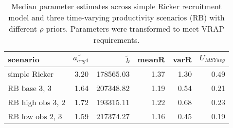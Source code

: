 \begin{table}[ht]
\centering
\caption{Median parameter estimates across simple Ricker recruitment model and 
 three time-varying productivity scenarios (RB) with different $\rho$ priors. Parameters were transformed to meet VRAP requirements.} 
\label{vraptab}
\begin{tabular}{lrrrrr}
  \hline
scenario & $\widetilde{a_{avg4}}$ & $\widetilde{b}$ & meanR & varR & $U_{MSY avg}$ \\ 
  \hline
simple Ricker & 3.20 & 178565.03 & 1.37 & 1.30 & 0.49 \\ 
  RB base 3, 3 & 1.64 & 207348.82 & 1.19 & 0.54 & 0.21 \\ 
  RB high obs 3, 2 & 1.72 & 193315.11 & 1.22 & 0.68 & 0.23 \\ 
  RB low obs 2, 3 & 1.59 & 217374.27 & 1.16 & 0.45 & 0.19 \\ 
   \hline
\end{tabular}
\end{table}
